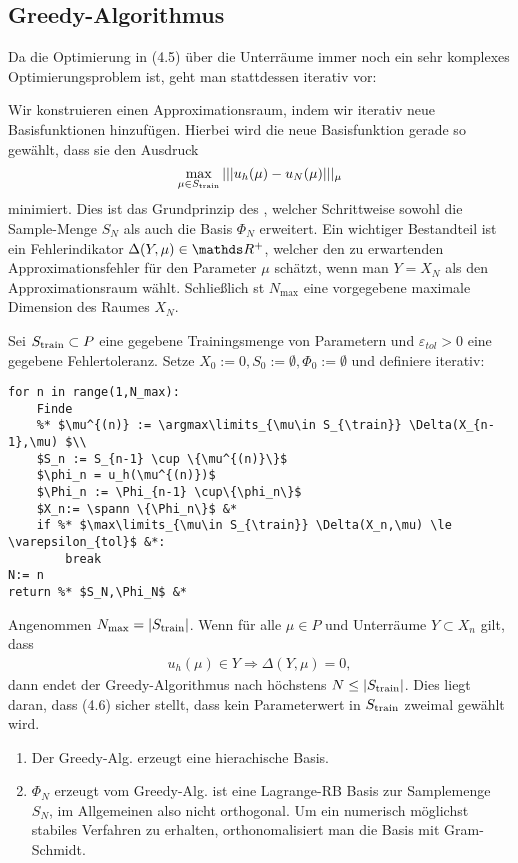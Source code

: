 \subsection{Greedy-Algorithmus}
Da die Optimierung in (4.5) über die Unterräume immer noch ein sehr komplexes Optimierungsproblem ist, geht man stattdessen iterativ vor:

Wir konstruieren einen Approximationsraum, indem wir iterativ neue Basisfunktionen hinzufügen.
Hierbei wird die neue Basisfunktion gerade so gewählt, dass sie den Ausdruck
\[
\max\limits_{\mu\in S_{\operatorname{train}}} |||u_h(\mu)-u_N(\mu)|||_\mu
\]
minimiert.
Dies ist das Grundprinzip des , welcher Schrittweise sowohl die Sample-Menge $S_N$ als auch die Basis $\Phi_N$ erweitert.
Ein wichtiger Bestandteil ist ein Fehlerindikator $\Delta(Y,\mu)\in \R^+$, welcher den zu erwartenden Approximationsfehler für den Parameter $\mu$ schätzt, wenn man $Y=X_N$ als den Approximationsraum wählt.
Schließlich st $N_{\max}$ eine vorgegebene maximale Dimension des Raumes $X_N$.

Sei $S_{\operatorname{train}}\subset P$ eine gegebene Trainingsmenge von Parametern und $\varepsilon_{tol}>0$ eine gegebene Fehlertoleranz.
Setze $X_0:={0}, S_0 := \emptyset, \Phi_0:= \emptyset$ und definiere iterativ:
\begin{lstlisting}
for n in range(1,N_max):
	Finde 
	%* $\mu^{(n)} := \argmax\limits_{\mu\in S_{\train}} \Delta(X_{n-1},\mu) $\\
	$S_n := S_{n-1} \cup \{\mu^{(n)}\}$
	$\phi_n = u_h(\mu^{(n)})$
	$\Phi_n := \Phi_{n-1} \cup\{\phi_n\}$
	$X_n:= \spann \{\Phi_n\}$ &*
	if %* $\max\limits_{\mu\in S_{\train}} \Delta(X_n,\mu) \le \varepsilon_{tol}$ &*:
		break
N:= n
return %* $S_N,\Phi_N$ &*
\end{lstlisting}

Angenommen $N_{\max} = |S_{\operatorname{train}}|$. Wenn für alle $\mu \in P$ und Unterräume $Y\subset X_n$ gilt, dass
\begin{align}
u_h(\mu)\in Y \Rightarrow \Delta(Y,\mu) = 0,
\end{align}
dann endet der Greedy-Algorithmus nach höchstens $N\le |S_{\operatorname{train}}|$.
Dies liegt daran, dass (4.6) sicher stellt, dass kein Parameterwert in $S_{\operatorname{train}}$ zweimal gewählt wird.

\begin{enumerate}[(1)]
	\item Der Greedy-Alg. erzeugt eine hierachische Basis.
	\item $\Phi_N$ erzeugt vom Greedy-Alg. ist eine Lagrange-RB Basis zur Samplemenge $S_N$, im Allgemeinen also nicht orthogonal.
	Um ein numerisch möglichst stabiles Verfahren zu erhalten, orthonomalisiert man die Basis mit Gram-Schmidt.
\end{enumerate}

